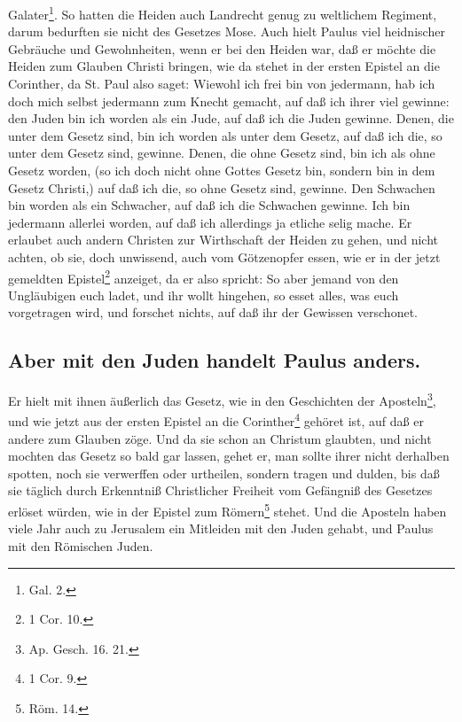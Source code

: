 Galater\footnote{Gal. 2.}. So hatten die Heiden auch Landrecht genug zu weltlichem Regiment, darum bedurften sie nicht des Gesetzes Mose. Auch hielt Paulus viel heidnischer Gebräuche und Gewohnheiten, wenn er bei den Heiden war, daß er möchte die Heiden zum Glauben Christi bringen, wie da stehet in der ersten Epistel an die Corinther, da St. Paul also saget: Wiewohl ich frei bin von jedermann, hab ich doch mich selbst jedermann zum Knecht gemacht, auf daß ich ihrer viel gewinne: den Juden bin ich worden als ein Jude, auf daß ich die Juden gewinne. Denen, die unter dem Gesetz sind, bin ich worden als unter dem Gesetz, auf daß ich die, so unter dem Gesetz sind, gewinne. Denen, die ohne Gesetz sind, bin ich als ohne Gesetz worden, (so ich doch nicht ohne Gottes Gesetz bin, sondern bin in dem Gesetz Christi,) auf daß ich die, so ohne Gesetz sind, gewinne. Den Schwachen bin worden als ein Schwacher, auf daß ich die Schwachen gewinne. Ich bin jedermann allerlei worden, auf daß ich allerdings ja etliche selig mache. Er erlaubet auch andern Christen zur Wirthschaft der Heiden zu gehen, und nicht achten, ob sie, doch unwissend, auch vom Götzenopfer essen, wie er in der jetzt gemeldten Epistel\footnote{1 Cor. 10.} anzeiget, da er also spricht: So aber jemand von den Ungläubigen euch ladet, und ihr wollt hingehen, so esset alles, was euch vorgetragen wird, und forschet nichts, auf daß ihr der Gewissen verschonet.

\subsection*{Aber mit den Juden handelt Paulus anders.}

Er hielt mit ihnen äußerlich das Gesetz, wie in den Geschichten der Aposteln\footnote{Ap. Gesch. 16. 21.}, und wie jetzt aus der ersten Epistel an die Corinther\footnote{1 Cor. 9.} gehöret ist, auf daß er andere zum Glauben zöge. Und da sie schon an Christum glaubten, und nicht mochten das Gesetz so bald gar lassen, gehet er, man sollte ihrer nicht derhalben spotten, noch sie verwerffen oder urtheilen, sondern tragen und dulden, bis daß sie täglich durch
Erkenntniß Christlicher Freiheit vom Gefängniß des Gesetzes erlöset würden, wie in der Epistel zum Römern\footnote{Röm. 14.} stehet. Und die Aposteln haben viele Jahr auch zu Jerusalem ein Mitleiden mit den Juden gehabt, und Paulus mit den Römischen Juden.

